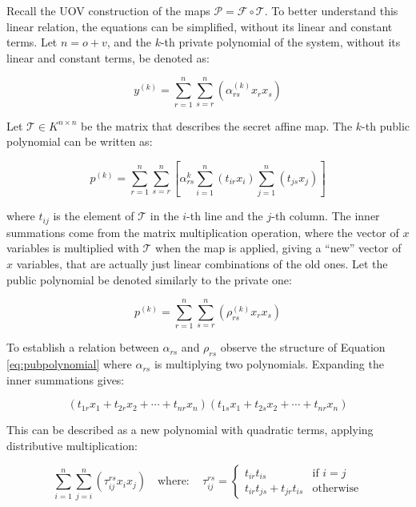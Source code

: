 \documentclass{ufsctex/ufsctex}
\begin{document}
Recall the UOV construction of the maps $\mathcal{P} = \mathcal{F} \circ
\mathcal{T}$. To better understand this linear relation, the equations can be
simplified, without its linear and constant terms. Let $n = o + v$, and the
$k$-th private polynomial of the system, without its linear and constant terms,
be denoted as:

\begin{equation}
y^{(k)} = \sum_{r=1}^n \sum_{s=r}^n\left(\alpha^{(k)}_{rs}x_rx_s\right)
\end{equation}

Let $\mathcal{T} \in K^{n \times n}$ be the matrix that describes the secret
affine map. The $k$-th public polynomial can be written as:

\begin{equation}\label{eq:pubpolynomial}
p^{(k)} = \sum_{r=1}^n \sum_{s=r}^n
\left[ \alpha^{k}_{rs} \sum_{i=1}^n(t_{ir}x_i) \sum_{j=1}^n(t_{js}x_j) \right]
\end{equation}

where $t_{ij}$ is the element of $\mathcal{T}$ in the $i$-th line and the
$j$-th column. The inner summations come from the matrix multiplication
operation, where the vector of $x$ variables is multiplied with $\mathcal{T}$
when the map is applied, giving a ``new'' vector of $x$ variables, that are
actually just linear combinations of the old ones. Let the public polynomial be
denoted similarly to the private one:

\begin{equation}
p^{(k)} = \sum_{r=1}^n \sum_{s=r}^n \left( \rho^{(k)}_{rs}x_rx_s \right)
\end{equation}

To establish a relation between $\alpha_{rs}$ and $\rho_{rs}$
observe the structure of Equation \ref{eq:pubpolynomial} where $\alpha_{rs}$ is
multiplying two polynomials. Expanding the inner summations gives:

\begin{equation}
(t_{1r}x_1 + t_{2r}x_2 + \cdots + t_{nr}x_n)
(t_{1s}x_1 + t_{2s}x_2 + \cdots + t_{nr}x_n)
\end{equation}

This can be described as a new polynomial with quadratic terms, applying
distributive multiplication:

\begin{equation}\label{eq:tau}
\sum_{i=1}^{n}\sum_{j=i}^n \left( \tau^{rs}_{ij} x_i x_j \right)
\quad \mathrm{where:} \quad \tau^{rs}_{ij} =
\begin{cases}
	t_{ir} t_{is} &\mbox{if } i=j \\
	t_{ir} t_{js} + t_{jr} t_{is} &\mbox{otherwise}
\end{cases}
\end{equation}
\end{document}

